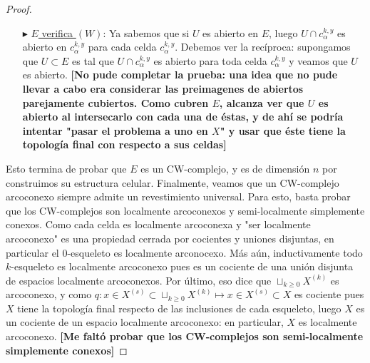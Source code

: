 \documentclass[11pt]{article}
\begin{document}
\begin{proof}
\begin{itemize}
y m\'as a\'un de aqu\'i se ve que si $c_\beta^{l,y}$ es cara de $c_\alpha^{k,x}$ entonces $e_\alpha^l$ es cara de  $e_\beta^k$. Entonces, si $c_\beta^{l,y}$ tuviese infinitas caras, tendr\'iamos al menos numerables celdas $\{c_{\alpha_n}^{k_n,y_n}\}_{n \geq 1}$ que son caras de $c_\beta^{l,y}$. Luego las celdas $\{e_{\alpha_n}^{k_n}\}_{n \geq 1}$ ser\'ian caras de $e_\beta^l$ y como $X$ es CW-complejo, deben ser finitas: as\'i, las suceciones $(\alpha_n)_n,(k_n)_n$ toman finitos valores $\gamma_1, \dots, \gamma_s$ y $m_1, \dots, m_r$. Luego, debe existir un par $(\gamma_i,k_j)$ tal que hay infinitas celdas de la forma $c_{\gamma_i}^{k_j,x}$ que son caras de $c_\beta^{l,y}$. \textbf{[Me falt\'o probar que esto \'ultimo es absurdo. Una idea que tuve, pero que no pude conretar, fue intentar ver que algunos de estos puntos formaban un subespacio discreto y usar la compacidad de $c_\alpha^{l,y}$]}
\item[$\blacktriangleright$] \underline{$E$ verifica $(W)$}: Ya sabemos que si $U$ es abierto en $E$, luego $U \cap c_\alpha^{k,y}$ es abierto en $c_\alpha^{k,y}$ para cada celda $c_\alpha^{k,y}$. Debemos ver la rec\'iproca: supongamos que $U \subset E$ es tal que $U \cap c_\alpha^{k,y}$ es abierto para toda celda $c_\alpha^{k,y}$ y veamos que $U$ es abierto. \textbf{[No pude completar la prueba: una idea que no pude llevar a cabo era considerar las preimagenes de abiertos parejamente cubiertos. Como cubren $E$, alcanza ver que $U$ es abierto al intersecarlo con cada una de \'estas, y de ah\'i se podr\'ia intentar "pasar el problema a uno en $X$" y usar que \'este tiene la topolog\'ia final con respecto a sus celdas]}
\end{itemize}
Esto termina de probar que $E$ es un CW-complejo, y es de dimensi\'on $n$ por construimos su estructura celular. Finalmente, veamos que un CW-complejo arcoconexo siempre admite un revestimiento universal. Para esto, basta probar que los CW-complejos son localmente arcoconexos y semi-localmente simplemente conexos. Como cada celda es localmente arcoconexa y "ser localmente arcoconexo" es una propiedad cerrada por cocientes y uniones disjuntas, en particular el $0$-esqueleto es localmente arconocexo. M\'as a\'un, inductivamente todo $k$-esqueleto es localmente arcoconexo pues es un cociente de una uni\'on disjunta de espacios localmente arcoconexos. Por \'ultimo, eso dice que $\sqcup_{k \geq 0}X^{(k)}$ es arcoconexo, y como $q : x \in X^{(s)} \subset \sqcup_{k \geq 0}X^{(k)} \mapsto x \in X^{(s)} \subset X$ es cociente pues $X$ tiene la topolog\'ia final respecto de las inclusiones de cada esqueleto, luego $X$ es un cociente de un espacio localmente arcoconexo: en particular, $X$ es localmente arcoconexo. \textbf{[Me falt\'o probar que los CW-complejos son semi-localmente simplemente conexos]}
\end{proof}
\end{document}
